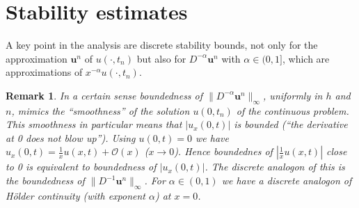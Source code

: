 \documentclass{siamltex}
\newcommand{\bu}{\mathbf u}
\newtheorem{remark}{Remark}[section]
\begin{document}
\section{Stability estimates} \label{sec:Stability}
A key point in the analysis are discrete stability bounds, not only for the approximation $\bu^n$ of $u(\cdot,t_n)$ but also for $D^{-\alpha}\bu^n$ with $\alpha \in (0,1]$, which are approximations of $x^{-\alpha}u(\cdot, t_n)$.
\begin{remark} \label{Rem1}
 \rm In a certain sense boundedness of $\|D^{-\alpha}\bu^n\|_\infty$, uniformly in $h$ and $n$, mimics the ``smoothness'' of the solution $u(0,t_n)$ of the continuous problem. This smoothness in particular means that $|u_x(0,t)|$ is bounded (``the derivative at 0 does not blow up''). Using $u(0,t)=0$ we have $u_x(0,t)= \frac{1}{x}u(x,t)+ \mathcal{O}(x)$ ($ x \to 0$). Hence boundednes of $|\frac{1}{x}u(x,t)|$ close to 0 is equivalent to boundedness of $|u_x(0,t)|$. The discrete analogon of this is the boundedness of $\|D^{-1}\bu^n\|_\infty$. For 
 $\alpha \in (0,1)$ we have a discrete analogon of Hölder continuity (with exponent $\alpha$) at $x=0$. 
\end{remark}
\end{document}
